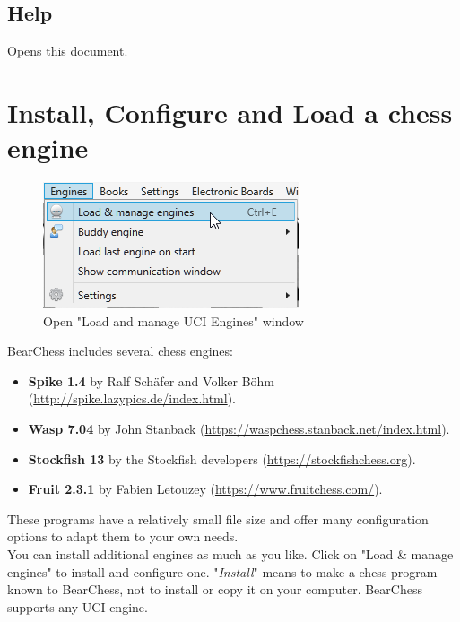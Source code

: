 \documentclass[11pt,a4paper]{article}
\begin{document}
	\subsection{Help}
	Opens this document.
	
	\section{Install, Configure and Load a chess engine} \label{loadEngines}
	
	\begin{figure}[H]
		\centering
		\includegraphics[scale=1.0]{LoadEngine.png}
		\caption{Open "Load and manage UCI Engines" window}
		\label{fig:LoadEngine}
	\end{figure}
	BearChess includes several chess engines:
	\begin{itemize}
		\item \textbf{Spike 1.4} by Ralf Schäfer and Volker Böhm (\url{http://spike.lazypics.de/index.html}).
        \item \textbf{Wasp 7.04} by John Stanback (\url{https://waspchess.stanback.net/index.html}).
        \item \textbf{Stockfish 13} by the Stockfish developers (\url{https://stockfishchess.org}).        
        \item \textbf{Fruit 2.3.1} by Fabien Letouzey (\url{https://www.fruitchess.com/}).                
	\end{itemize}	
	These programs have a relatively small file size and offer many configuration options to adapt them to your own needs.\\
	You can install additional engines as much as you like. Click on "Load \& manage engines" to install and configure one. "\textit{Install}" means to make a chess program known to BearChess, not to install or copy it on your computer. BearChess supports any UCI engine.\\
\end{document}
